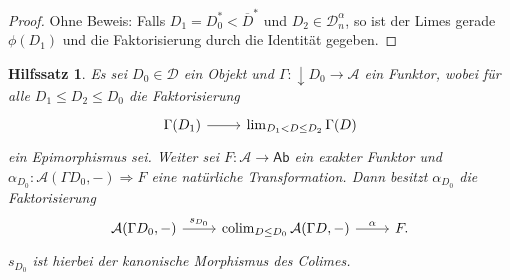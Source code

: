 \documentclass[a4paper, parskip=half]{scrartcl}
\theoremstyle{marginbreak}
\newtheorem{lemma}[remark]{Hilfssatz}
\theoremstyle{nonumberplain}
\newtheorem{proof}{Beweis.}
\newcommand\ccat\mathsf
\newcommand\cat\mathcal
\newcommand{\down}[1]{{\downarrow}#1}
\newcommand\nat\Rightarrow
\DeclareMathOperator{\colim}{colim}
\begin{document}
{\begin{proof}
			Ohne Beweis: Falls $D_1=D_0^*<\overline{D}^*$ und $D_2\in\cat{D}_n^\alpha$,
			so ist der Limes gerade $\phi(D_1)$ und die Faktorisierung durch die Identität gegeben.
		\end{proof}}
		\begin{lemma}\label{func}
			Es sei $D_0\in\cat{D}$ ein Objekt und $\Gamma\colon \down{D_0}\to\cat{A}$
			ein Funktor, wobei für alle $D_1\leq D_2\leq D_0$ die Faktorisierung
			\[
				\begin{tikzcd}
					\Gamma(D_1) \arrow[r] & \lim_{D_1<D\leq D_2} \Gamma(D)
				\end{tikzcd}
			\]
			ein Epimorphismus sei. Weiter sei $F\colon\cat{A}\to\ccat{Ab}$ ein exakter
			Funktor und $\alpha_{D_0}\colon \cat{A}(\Gamma D_0, {-})\nat F$
			eine natürliche Transformation. Dann besitzt $\alpha_{D_0}$ die
			Faktorisierung
			\[
				\begin{tikzcd}
					\cat{A}(\Gamma D_0, {-}) \arrow{r}{s_{D_0}} & \colim_{D\leq D_0}\cat{A}(\Gamma D, {-}) \arrow{r}{\alpha} & F.
				\end{tikzcd}
			\]
			$s_{D_0}$ ist hierbei der kanonische Morphismus des Colimes.
		\end{lemma}
\end{document}
